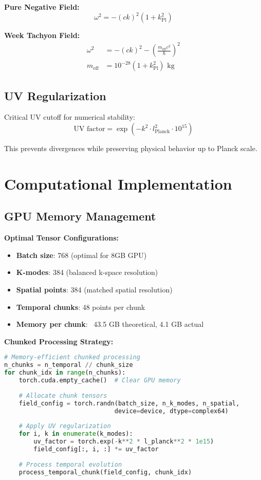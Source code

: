 \documentclass[11pt]{article}
\begin{document}
\textbf{Pure Negative Field:}
\begin{equation}
\omega^2 = -(ck)^2(1 + k_{\text{Pl}}^2)
\end{equation}

\textbf{Week Tachyon Field:}
\begin{align}
\omega^2 &= -(ck)^2 - \left(\frac{m_{\text{eff}}c^2}{\hbar}\right)^2 \\
m_{\text{eff}} &= 10^{-28}(1 + k_{\text{Pl}}^2) \text{ kg}
\end{align}

\subsection{UV Regularization}

Critical UV cutoff for numerical stability:
\begin{equation}
\text{UV factor} = \exp(-k^2 \cdot l_{\text{Planck}}^2 \cdot 10^{15})
\end{equation}

This prevents divergences while preserving physical behavior up to Planck scale.

\section{Computational Implementation}

\subsection{GPU Memory Management}

\textbf{Optimal Tensor Configurations:}
\begin{itemize}
    \item \textbf{Batch size}: 768 (optimal for 8GB GPU)
    \item \textbf{K-modes}: 384 (balanced k-space resolution)  
    \item \textbf{Spatial points}: 384 (matched spatial resolution)
    \item \textbf{Temporal chunks}: 48 points per chunk
    \item \textbf{Memory per chunk}: ~43.5 GB theoretical, 4.1 GB actual
\end{itemize}

\textbf{Chunked Processing Strategy:}
\begin{lstlisting}[language=Python]
# Memory-efficient chunked processing
n_chunks = n_temporal // chunk_size
for chunk_idx in range(n_chunks):
    torch.cuda.empty_cache()  # Clear GPU memory
    
    # Allocate chunk tensors
    field_config = torch.randn(batch_size, n_k_modes, n_spatial,
                              device=device, dtype=complex64)
    
    # Apply UV regularization
    for i, k in enumerate(k_modes):
        uv_factor = torch.exp(-k**2 * l_planck**2 * 1e15)
        field_config[:, i, :] *= uv_factor
    
    # Process temporal evolution
    process_temporal_chunk(field_config, chunk_idx)
\end{lstlisting}
\end{document}
